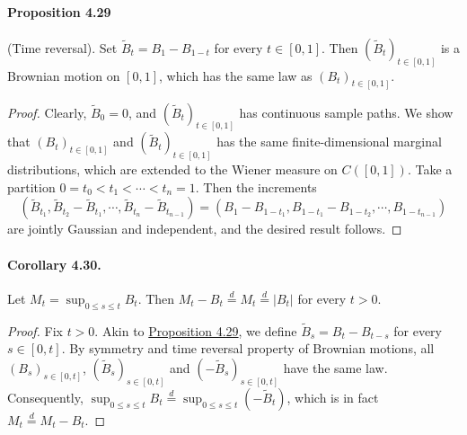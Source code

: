 \documentclass{article}
\numberwithin{equation}{section}
\theoremstyle{plain}
\theoremstyle{definition}
\begin{document}
\paragraph{Proposition 4.29\label{prop:4.29}} (Time reversal). Set $\widetilde{B}_t=B_1-B_{1-t}$ for every $t\in[0,1]$. Then $(\widetilde{B}_t)_{t\in[0,1]}$ is a Brownian motion on $[0,1]$, which has the same law as $(B_t)_{t\in[0,1]}$.
\begin{proof}
Clearly, $\widetilde{B}_0=0$, and $(\widetilde{B}_t)_{t\in[0,1]}$ has continuous sample paths. We show that $(B_t)_{t\in[0,1]}$ and $(\widetilde{B}_t)_{t\in[0,1]}$ has the same finite-dimensional marginal distributions, which are extended to the Wiener measure on $C([0,1])$. Take a partition $0=t_0<t_1<\cdots<t_n=1$. Then the increments $$(\widetilde{B}_{t_1},\widetilde{B}_{t_2}-\widetilde{B}_{t_1},\cdots,\widetilde{B}_{t_n}-\widetilde{B}_{t_{n-1}})=(B_1-B_{1-t_1},B_{1-t_1}-B_{1-t_2},\cdots,B_{1-t_{n-1}})$$
are jointly Gaussian and independent, and the desired result follows.
\end{proof}

\paragraph{Corollary 4.30.\label{cor:4.30}} Let $M_t=\sup_{0\leq s\leq t}B_t$. Then $M_t-B_t\overset{d}{=}M_t\overset{d}{=}\vert B_t\vert$ for every $t>0$.
\begin{proof}
Fix $t>0$. Akin to \hyperref[prop:4.29]{Proposition 4.29}, we define $\widetilde{B}_s=B_t-B_{t-s}$ for every $s\in[0,t]$. By symmetry and time reversal property of Brownian motions, all $(B_s)_{s\in[0,t]}$, $(\widetilde{B}_s)_{s\in[0,t]}$ and $(-\widetilde{B}_s)_{s\in[0,t]}$ have the same law. Consequently, $\sup_{0\leq s\leq t}B_t\overset{d}{=}\sup_{0\leq s\leq t}(-\widetilde{B}_t)$, which is in fact $M_t\overset{d}{=} M_t-B_t$.
\end{proof}
\end{document}
